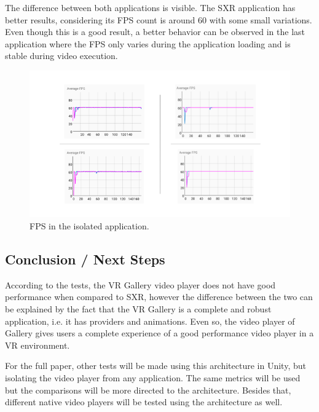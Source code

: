 \documentclass[runningheads]{llncs}
\begin{document}
The difference between both applications is visible. The SXR application has better results, considering its FPS count is around 60 with some small variations. Even though this is a good result, a better behavior can be observed in the last application where the FPS only varies during the application loading and is stable during video execution.

\begin{figure}[!h]
    \centering
    \includegraphics[width=\linewidth]{images/SeparetedApp.png}
    \caption{FPS in the isolated application.}
    \label{app-graph}
\end{figure}


\subsection{Conclusion / Next Steps} \label{conclusion}
According to the tests, the VR Gallery video player does not have good performance when compared to SXR, however the difference between the two can be explained by the fact that the VR Gallery is a complete and robust application, i.e. it has providers and animations. Even so, the video player of Gallery gives users a complete experience of a good performance video player in a VR environment.

For the full paper, other tests will be made using this architecture in Unity, but isolating the video player from any application. The same metrics will be used but the comparisons will be more directed to the architecture. Besides that, different native video players will be tested using the architecture as well.

%
%
%


\end{document}
